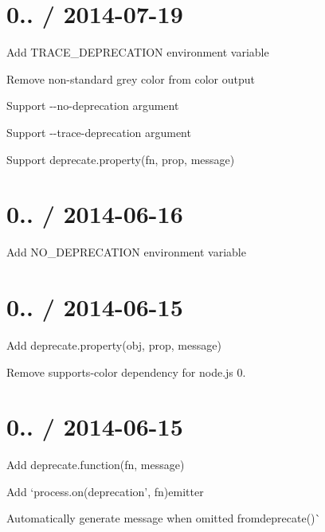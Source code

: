 \section*{0.. / 2014-\/07-\/19 }


\begin{DoxyItemize}
\item Add {\ttfamily T\+R\+A\+C\+E\+\_\+\+D\+E\+P\+R\+E\+C\+A\+T\+I\+ON} environment variable
\item Remove non-\/standard grey color from color output
\item Support {\ttfamily -\/-\/no-\/deprecation} argument
\item Support {\ttfamily -\/-\/trace-\/deprecation} argument
\item Support {\ttfamily deprecate.\+property(fn, prop, message)}
\end{DoxyItemize}

\section*{0.. / 2014-\/06-\/16 }


\begin{DoxyItemize}
\item Add {\ttfamily N\+O\+\_\+\+D\+E\+P\+R\+E\+C\+A\+T\+I\+ON} environment variable
\end{DoxyItemize}

\section*{0.. / 2014-\/06-\/15 }


\begin{DoxyItemize}
\item Add {\ttfamily deprecate.\+property(obj, prop, message)}
\item Remove {\ttfamily supports-\/color} dependency for node.\+js 0.
\end{DoxyItemize}

\section*{0.. / 2014-\/06-\/15 }


\begin{DoxyItemize}
\item Add {\ttfamily deprecate.\+function(fn, message)}
\item Add `process.\+on(\textquotesingle{}deprecation', fn){\ttfamily emitter}
\item {\ttfamily Automatically generate message when omitted from}deprecate()\`{}
\end{DoxyItemize}

